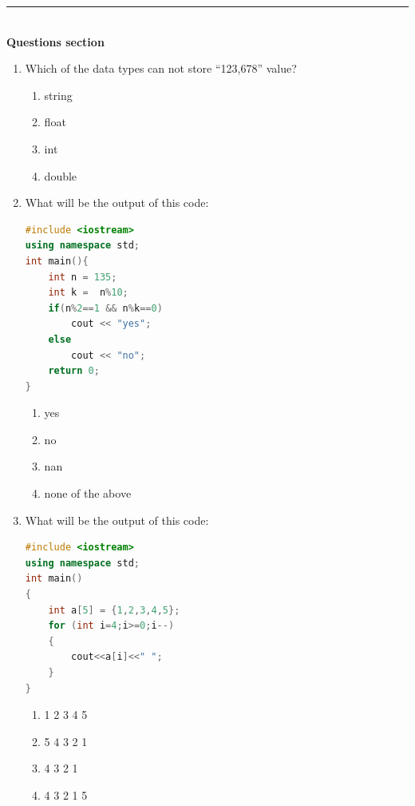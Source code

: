 \documentclass[10pt]{article}
\begin{document}
\medskip\hrule
\textbf{
\\
{Questions section}\\
}
\begin{enumerate}

\item Which of the data types can not store “123,678” value?
\begin{multicols}{4}
\begin{enumerate}
    \item string
    \item float
    \item int
    \item double
\end{enumerate}
\end{multicols}




\item What will be the output of this code:
\begin{lstlisting}[language=C++]
#include <iostream>
using namespace std;
int main(){
    int n = 135;
    int k =  n%10;
    if(n%2==1 && n%k==0)
        cout << "yes";
    else
        cout << "no";
    return 0;
}

\end{lstlisting}
\begin{multicols}{4}
\begin{enumerate}
    \item yes
    \item no
    \item nan
    \item none of the above
\end{enumerate}
\end{multicols}





\item What will be the output of this code:
\begin{lstlisting}[language=C++]
#include <iostream>
using namespace std;
int main()
{
    int a[5] = {1,2,3,4,5};
    for (int i=4;i>=0;i--)
    {
        cout<<a[i]<<" ";
    }
}

\end{lstlisting}
\begin{multicols}{4}
\begin{enumerate}
    \item 1 2 3 4 5
    \item 5 4 3 2 1
    \item 4 3 2 1
    \item 4 3 2 1 5
\end{enumerate}
\end{multicols}











\end{enumerate}
\end{document}
